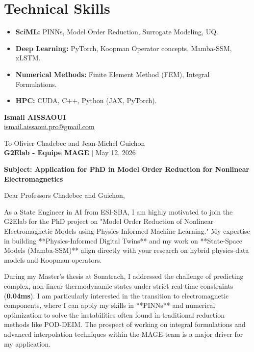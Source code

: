 \documentclass[a4paper,11pt]{article}
\begin{document}
\section{Technical Skills}
\begin{itemize}
    \item \textbf{SciML:} PINNs, Model Order Reduction, Surrogate Modeling, UQ.
    \item \textbf{Deep Learning:} PyTorch, Koopman Operator concepts, Mamba-SSM, xLSTM.
    \item \textbf{Numerical Methods:} Finite Element Method (FEM), Integral Formulations.
    \item \textbf{HPC:} CUDA, C++, Python (JAX, PyTorch).
\end{itemize}

\newpage

\begin{flushleft}
    \textbf{Ismail AISSAOUI} \\
    \href{mailto:ismail.aissaoui.pro@gmail.com}{ismail.aissaoui.pro@gmail.com}
\end{flushleft}

\begin{flushright}
    To Olivier Chadebec and Jean-Michel Guichon \\
    \textbf{G2Elab - Equipe MAGE} $|$ May 12, 2026
\end{flushright}

\bigskip
\noindent \textbf{Subject: Application for PhD in Model Order Reduction for Nonlinear Electromagnetics}
\bigskip

Dear Professors Chadebec and Guichon,

As a State Engineer in AI from ESI-SBA, I am highly motivated to join the G2Elab for the PhD project on "Model Order Reduction of Nonlinear Electromagnetic Models using Physics-Informed Machine Learning." My expertise in building **Physics-Informed Digital Twins** and my work on **State-Space Models (Mamba-SSM)** align directly with your research on hybrid physics-data models and Koopman operators.

During my Master's thesis at Sonatrach, I addressed the challenge of predicting complex, non-linear thermodynamic states under strict real-time constraints (\textbf{0.04ms}). I am particularly interested in the transition to electromagnetic components, where I can apply my skills in **PINNs** and numerical optimization to solve the instabilities often found in traditional reduction methods like POD-DEIM. The prospect of working on integral formulations and advanced interpolation techniques within the MAGE team is a major driver for my application.
\end{document}
